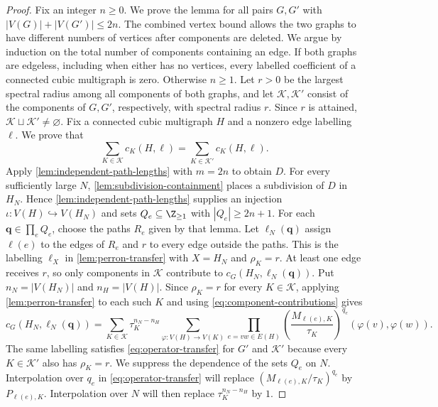 \begin{proof}
Fix an integer $n\geq0$. We prove the lemma for all pairs $G,G'$ with
$|V(G)|+|V(G')|\leq2n$.
The combined vertex bound allows the two graphs to have different
numbers of vertices after components are deleted.
We argue by induction on the total number of components containing an edge.
If both graphs are edgeless, including when either has no vertices,
every labelled coefficient of a connected cubic multigraph is zero.
Otherwise $n\geq1$. Let $r>0$ be the largest spectral radius among all
components of both graphs, and let $\mathcal K,\mathcal K'$ consist of
the components of $G,G'$, respectively, with spectral radius $r$.
Since $r$ is attained, $\mathcal K\sqcup\mathcal K'\ne\varnothing$.
Fix a connected cubic multigraph $H$ and a nonzero edge labelling $\ell$.
We prove that
\begin{equation}\label{eq:layer-contractions}
 \sum_{K\in\mathcal K}c_K(H,\ell)
 =\sum_{K\in\mathcal K'}c_K(H,\ell).
\end{equation}
Apply \cref{lem:independent-path-lengths} with $m=2n$ to obtain $D$.
For every sufficiently large $N$, \cref{lem:subdivision-containment}
places a subdivision of $D$ in $H_N$.
Hence \cref{lem:independent-path-lengths} supplies an injection
$\iota:V(H)\hookrightarrow V(H_N)$ and sets
$Q_e\subseteq\Z_{\geq1}$ with $|Q_e|\geq2n+1$.
For each $\mathbf q\in\prod_eQ_e$, choose the paths $R_e$ given by that
lemma. Let $\ell_N(\mathbf q)$ assign $\ell(e)$ to the edges of $R_e$
and $r$ to every edge outside the paths.
This is the labelling $\ell_X$ in \cref{lem:perron-transfer} with
$X=H_N$ and $\rho_K=r$.
At least one edge receives $r$, so only components in $\mathcal K$
contribute to $c_G(H_N,\ell_N(\mathbf q))$.
Put $n_N=|V(H_N)|$ and $n_H=|V(H)|$.
Since $\rho_K=r$ for every $K\in\mathcal K$, applying
\cref{lem:perron-transfer} to each such $K$ and using
\cref{eq:component-contributions} gives
\begin{equation}\label{eq:operator-transfer}
 c_G(H_N,\ell_N(\mathbf q))=\sum_{K\in\mathcal K}\tau_K^{n_N-n_H}
   \sum_{\varphi:V(H)\to V(K)}
   \prod_{e=vw\in E(H)}
       \left(\frac{M_{\ell(e),K}}{\tau_K}\right)^{q_e}(\varphi(v),\varphi(w)).
\end{equation}
The same labelling satisfies \cref{eq:operator-transfer} for $G'$ and
$\mathcal K'$ because every $K\in\mathcal K'$ also has $\rho_K=r$.
We suppress the dependence of the sets $Q_e$ on $N$.
Interpolation over $q_e$ in \cref{eq:operator-transfer} will replace
$(M_{\ell(e),K}/\tau_K)^{q_e}$ by $P_{\ell(e),K}$.
Interpolation over $N$ will then replace $\tau_K^{n_N-n_H}$ by $1$.


\end{proof}
